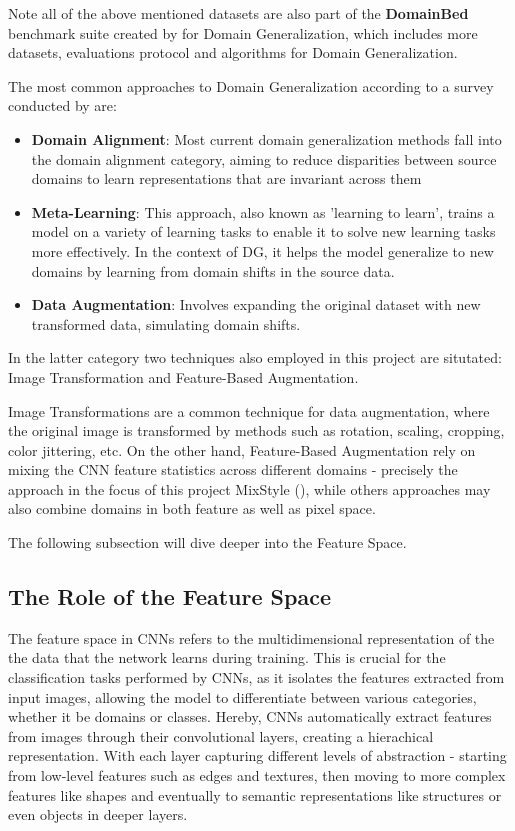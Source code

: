 Note all of the above mentioned datasets are also part of the \textbf{DomainBed} benchmark suite created by \cite{gulrajaniSearchLostDomain2020} for Domain Generalization, which includes more datasets, evaluations protocol and algorithms for Domain Generalization.

The most common approaches to Domain Generalization according to a survey conducted by \cite{zhouDomainGeneralizationSurvey2022} are: %
\begin{itemize}
 \item \textbf{Domain Alignment}: Most current domain generalization methods fall into the domain alignment category, aiming to reduce disparities between source domains to learn representations that are invariant across them
 \item \textbf{Meta-Learning}: This approach, also known as 'learning to learn', trains a model on a variety of learning tasks to enable it to solve new learning tasks more effectively. In the context of DG, it helps the model generalize to new domains by learning from domain shifts in the source data.
 \item \textbf{Data Augmentation}: Involves expanding the original dataset with new transformed data, simulating domain shifts.
\end{itemize}

In the latter category two techniques also employed in this project are situtated:
Image Transformation and Feature-Based Augmentation.

Image Transformations are a common technique for data augmentation, where the original image is transformed by methods such as rotation, scaling, cropping, color jittering, etc.
On the other hand, Feature-Based Augmentation rely on mixing the CNN feature statistics across different domains - precisely the approach in the focus of this project MixStyle (\cite{zhouMixStyleNeuralNetworks2023}), while others approaches may also combine domains in both feature as well as pixel space.

The following subsection will dive deeper into the Feature Space.
\subsection{The Role of the Feature Space}
The feature space in CNNs refers to the multidimensional representation of the the data that the network learns during training. This is crucial for the classification tasks performed by CNNs, as it isolates the features extracted from input images, allowing the model to differentiate between various categories, whether it be domains or classes.
Hereby, CNNs automatically extract features from images through their convolutional layers, creating a hierachical representation. With each layer capturing different levels of abstraction - starting from low-level features such as edges and textures, then moving to more complex features like shapes and eventually to semantic representations like structures or even objects in deeper layers. \cite{zeilerVisualizingUnderstandingConvolutional2013,Goodfellow-et-al-2016}

